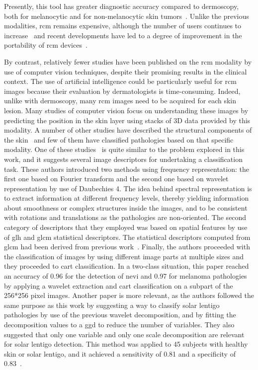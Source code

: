 \documentclass[journal,article,accept,moreauthors,pdftex, applsci]{Definitions/mdpi}
\begin{document}
Presently, this tool has greater diagnostic accuracy compared to dermoscopy, both for melanocytic and for non-melanocytic skin tumors~\cite{Haroon2017, Dinnes2018, Lupu2019}. Unlike the previous modalities, \ac{rcm} remains expensive, although the number of users continues to increase~\cite{Batta2015} and recent developments have led to a degree of improvement in the portability of \ac{rcm} devices~\cite{Freeman2018}.\par
By contrast, relatively fewer studies have been published on the \ac{rcm} modality by use of computer vision techniques, despite their promising results in the clinical context. The use of artificial intelligence could be particularly useful for \ac{rcm} images because their evaluation by dermatologists is time-consuming. Indeed, unlike with dermoscopy, many \ac{rcm} images need to be acquired for each skin lesion. Many studies of computer vision focus on understanding these images by predicting the position in the skin layer \cite{Somoza2014,Hames2016} using stacks of 3D data provided by this modality. A number of other studies have described the structural components of the skin~\cite{Gareau2010} and few of them have classified pathologies based on that specific modality. One of these studies~\cite{Wiltgen2008} is quite similar to the problem explored in this work, and it suggests several image descriptors for undertaking a classification task. These authors introduced two methods using frequency representation: the first one based on Fourier transform and the second one based on wavelet representation by use of Daubechies 4. The idea behind spectral representation is to extract information at different frequency levels, thereby yielding information about smoothness or complex structures inside the images, and to be consistent with rotations and translations as the pathologies are non-oriented. The second category of descriptors that they employed was based on spatial features by use of \ac{glh} and \ac{glcm} statistical descriptors. The statistical descriptors computed from \ac{glcm} had been derived from previous work~\cite{Haralick1973}. Finally, the authors proceeded with the classification of images by using different image parts at multiple sizes and they proceeded to \ac{cart} classification. In a two-class situation, this paper reached an accuracy of 0.96 for the detection of nevi and 0.97 for melanoma pathologies by applying a wavelet extraction and \ac{cart} classification on a subpart of the 256*256 pixel images. Another paper is more relevant, as the authors followed the same purpose as this work by suggesting a way to classify solar lentigo pathologies by use of the previous wavelet decomposition, and by fitting the decomposition values to a \ac{ggd} to reduce the number of variables. They also suggested that only one variable and only one scale decomposition are relevant for solar lentigo detection. This method was applied to 45 subjects with healthy skin or solar lentigo, and it achieved a sensitivity of 0.81 and a specificity of 0.83~\cite{Halimi2017a}.\par
\end{document}

